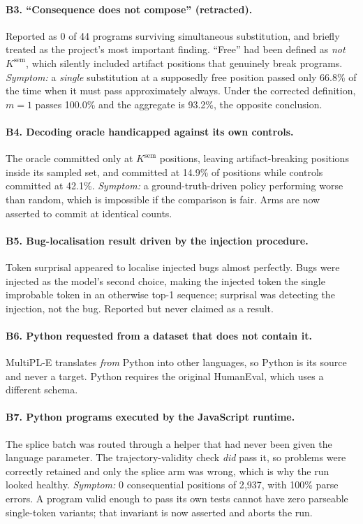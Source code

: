 \paragraph{B3. ``Consequence does not compose'' (retracted).} Reported as 0 of 44 programs
surviving simultaneous substitution, and briefly treated as the project's most important finding.
``Free'' had been defined as \emph{not} $K^{\mathrm{sem}}$, which silently included artifact
positions that genuinely break programs. \emph{Symptom:} a \emph{single} substitution at a
supposedly free position passed only 66.8\% of the time when it must pass approximately always.
Under the corrected definition, $m=1$ passes 100.0\% and the aggregate is 93.2\%, the opposite
conclusion.

\paragraph{B4. Decoding oracle handicapped against its own controls.} The oracle committed only at
$K^{\mathrm{sem}}$ positions, leaving artifact-breaking positions inside its sampled set, and
committed at 14.9\% of positions while controls committed at 42.1\%. \emph{Symptom:} a
ground-truth-driven policy performing worse than random, which is impossible if the comparison is
fair. Arms are now asserted to commit at identical counts.

\paragraph{B5. Bug-localisation result driven by the injection procedure.} Token surprisal appeared
to localise injected bugs almost perfectly. Bugs were injected as the model's second choice, making
the injected token the single improbable token in an otherwise top-1 sequence; surprisal was
detecting the injection, not the bug. Reported but never claimed as a result.

\paragraph{B6. Python requested from a dataset that does not contain it.} MultiPL-E translates
\emph{from} Python into other languages, so Python is its source and never a target. Python requires
the original HumanEval, which uses a different schema.

\paragraph{B7. Python programs executed by the JavaScript runtime.} The splice batch was routed
through a helper that had never been given the language parameter. The trajectory-validity check
\emph{did} pass it, so problems were correctly retained and only the splice arm was wrong, which is
why the run looked healthy. \emph{Symptom:} 0 consequential positions of 2{,}937, with 100\% parse
errors. A program valid enough to pass its own tests cannot have zero parseable single-token
variants; that invariant is now asserted and aborts the run.

